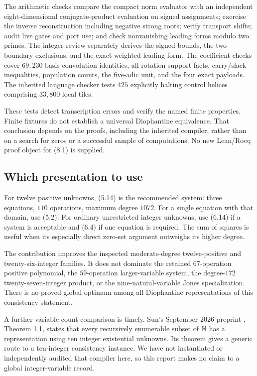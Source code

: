 The arithmetic checks compare the compact norm evaluator with
an independent eight-dimensional conjugate-product evaluation
on signed assignments; exercise the inverse reconstruction
including negative strong roots; verify transport shifts;
audit live gates and port use; and check nonvanishing leading
forms modulo two primes.
The integer review separately derives the signed bounds,
the two boundary exclusions, and the exact weighted leading form.
The coefficient checks cover \(69{,}230\) basis convolution
identities, all-rotation support facts, carry/slack inequalities,
population counts, the five-adic unit, and the four exact payloads.
The inherited language checker tests \(425\) explicitly halting
control helices comprising \(33{,}800\) local tiles.

These tests detect transcription errors and verify the named
finite properties. Finite fixtures do not establish a universal
Diophantine equivalence. That conclusion depends on the proofs,
including the inherited compiler, rather than on a search for
zeros or a successful sample of computations.
No new Lean/Rocq proof object for (8.1) is supplied.

\subsection{Which presentation to use}

For twelve positive unknowns, (5.14) is the recommended system:
three equations, \(110\) operations, maximum degree \(1072\).
For a single equation with that domain, use (5.2).
For ordinary unrestricted integer unknowns, use (6.14) if a
system is acceptable and (6.4) if one equation is required.
The sum of squares is useful when its especially direct
zero-set argument outweighs its higher degree.

The contribution improves the inspected moderate-degree
twelve-positive and twenty-six-integer families.
It does not dominate the retained \(67\)-operation positive
polynomial, the \(59\)-operation larger-variable system,
the degree-\(172\) twenty-seven-integer product, or the
nine-natural-variable Jones specialization.
There is no proved global optimum among all Diophantine
representations of this consistency statement.

A further variable-count comparison is timely.
Sun's September 2026 preprint \cite{sun10}, Theorem 1.1,
states that every recursively enumerable subset of \(\mathbb N\)
has a representation using ten integer existential unknowns.
Its theorem gives a generic route to a ten-integer consistency
instance. We have not instantiated or independently audited
that compiler here, so this report makes no claim to a global
integer-variable record.


